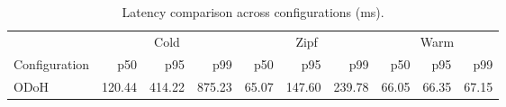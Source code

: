 \begin{table}[t]
\centering
\caption{Latency comparison across configurations (ms).}
\label{tab:comparison}
\small
\begin{tabular}{l rrr rrr rrr}
\toprule
 & \multicolumn{3}{c}{Cold} & \multicolumn{3}{c}{Zipf} & \multicolumn{3}{c}{Warm} \\
\cmidrule(lr){2-4} \cmidrule(lr){5-7} \cmidrule(lr){8-10}
Configuration & p50 & p95 & p99 & p50 & p95 & p99 & p50 & p95 & p99 \\
\midrule
ODoH & 120.44 & 414.22 & 875.23 & 65.07 & 147.60 & 239.78 & 66.05 & 66.35 & 67.15 \\
\bottomrule
\end{tabular}
\end{table}
